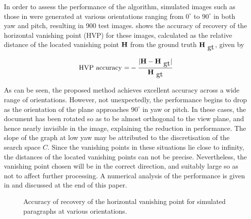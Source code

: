 In order to assess the performance of the algorithm, simulated images such as
those in  were generated at various orientations ranging from
$0^\circ$ to $90^\circ$ in both yaw and pitch, resulting in 900 test images. 
 shows the accuracy of recovery of the horizontal vanishing
point (HVP) for these images, 
calculated as the relative distance of the located vanishing point ${ \bf H }$ 
from the ground truth $\myvec{H}_{\mbox{\small gt}}$, given by

\begin{equation} 
\mbox{HVP accuracy =} -\frac{|\myvec{H}-\myvec{H}_{\mbox{\small gt}}|}{\myvec{H}_{\mbox{\small gt}}}
\end{equation}

As can be seen, the proposed method achieves excellent accuracy across a wide
range of orientations. However, not unexpectedly, the performance begins to drop
as the orientation of the plane approaches $90^\circ$ in yaw or pitch. In these
cases, the document has been rotated so as to be almost orthogonal to the view
plane, and hence nearly invisible in the image, explaining the reduction in
performance. The slope of the graph at low yaw may be attributed to the
discretisation of the search space $C$. Since the vanishing points in these
situations lie close to infinity, the distances of the located vanishing points
can not be precise. Nevertheless, the vanishing point chosen will be in the
correct direction, and suitably large so as not to affect further processing. A
numerical analysis of the performance is given in  and
discussed at the end of this paper.


\begin{figure}[t]
\centering
\begin{center}
\end{center}
\vspace*{0mm}
\caption{Accuracy of recovery of the horizontal vanishing point for simulated paragraphs at various orientations.}
\label{hvpaccuracy}
\end{figure}






